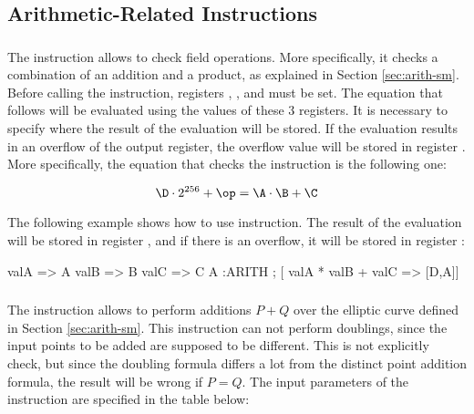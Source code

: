 




\subsection{Arithmetic-Related Instructions}

\subsubsection{\ARITH}

The \ARITH instruction allows to check field operations. More specifically, it checks a combination of an addition and a product, as explained in Section \ref{sec:arith-sm}. Before calling the \ARITH instruction, registers \A, \B, and \C must be set. The equation that follows will be evaluated using the values of these $3$ registers. It is necessary to specify where the result of the evaluation will be stored. If the evaluation results in an overflow of the output register, the overflow value will be stored in register \D. More specifically, the equation that checks the \ARITH instruction is the following one:

\[
\D \cdot 2^{256} + \op = \A \cdot \B + \C
\]

The following example shows how to use \ARITH instruction. The result of the evaluation will be stored in register \A, and if there is an overflow, it will be stored in register \D:
\begin{zkasm}
valA => A          
valB => B          
valC => C
A            :ARITH ; [ valA * valB + valC => [D,A]]
\end{zkasm}





\subsubsection{\ARITHADDDIFF}

The \ARITHADDDIFF instruction allows to perform additions $P + Q$ over the elliptic curve defined in Section \ref{sec:arith-sm}. This instruction can not perform doublings, since the input points to be added are supposed to be different. This is not explicitly check, but since the doubling formula differs a lot from the distinct point addition formula, the result will be wrong if $P = Q$. The input parameters of the instruction are specified in the table below:

